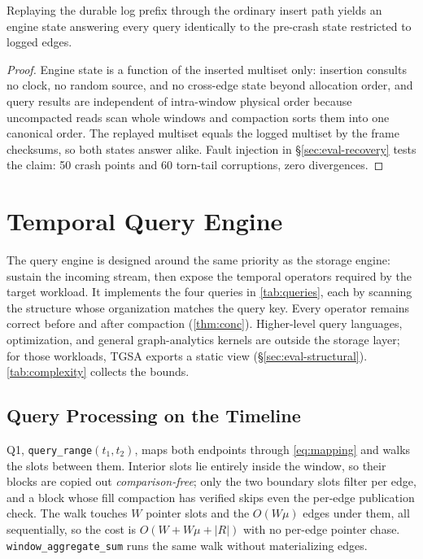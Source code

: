 \documentclass[sigconf,nonacm]{acmart}
\newcommand{\sys}{TGSA\xspace}
\begin{document}
\begin{theorem}[Recovery]
\label{thm:recover}
Replaying the durable log prefix through the ordinary insert path
yields an engine state answering every query identically to the
pre-crash state restricted to logged edges.
\end{theorem}
\begin{proof}
Engine state is a function of the inserted multiset only: insertion
consults no clock, no random source, and no cross-edge state beyond
allocation order, and query results are independent of intra-window
physical order because uncompacted reads scan whole windows and
compaction sorts them into one canonical order. The replayed multiset
equals the logged multiset by the frame checksums, so both states
answer alike. Fault injection in \S\ref{sec:eval-recovery} tests the
claim: 50 crash points and 60 torn-tail corruptions, zero divergences.
\end{proof}

\section{Temporal Query Engine}\label{sec:query}
The query engine is designed around the same priority as the storage
engine: sustain the incoming stream, then expose the temporal operators
required by the target workload. It implements the four queries in
\cref{tab:queries}, each by scanning the structure whose organization
matches the query key. Every operator remains correct before and after
compaction (\cref{thm:conc}). Higher-level query languages,
optimization, and general graph-analytics kernels are outside the
storage layer; for those workloads, \sys exports a static view
(\S\ref{sec:eval-structural}). \cref{tab:complexity} collects the
bounds.

\subsection{Query Processing on the Timeline}\label{sec:query-window}
Q1, \texttt{query\_range}$(t_1,t_2)$, maps both endpoints through
\cref{eq:mapping} and walks the slots between them. Interior slots lie
entirely inside the window, so their blocks are copied out
\emph{comparison-free}; only the two boundary slots filter per edge,
and a block whose fill compaction has verified skips even the per-edge
publication check. The walk touches $W$ pointer slots and the $O(W\mu)$
edges under them, all sequentially, so the cost is $O(W + W\mu + |R|)$
with no per-edge pointer chase. \texttt{window\_aggregate\_sum} runs
the same walk without materializing edges.
\end{document}

